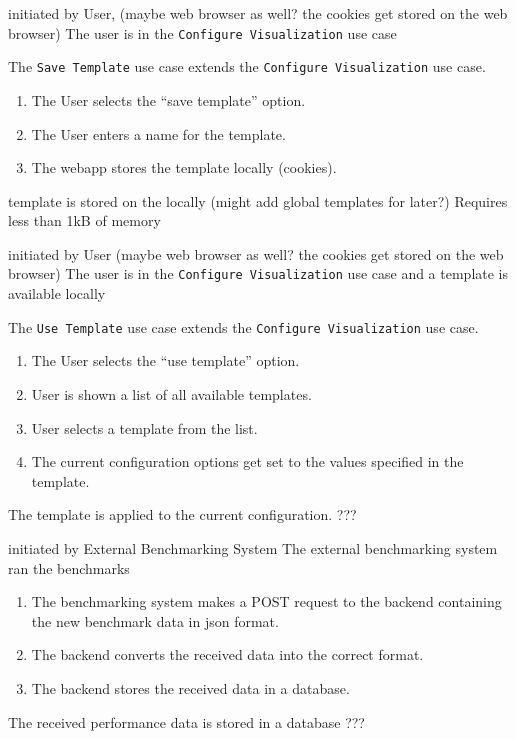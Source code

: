 {initiated by User, (maybe web browser as well? the cookies get stored on the web browser)}
{The user is in the \texttt{Configure Visualization} use case}
{The \texttt{Save Template} use case extends the \texttt{Configure Visualization} use case.
\begin{enumerate}
    \item The User selects the \enquote{save template} option.
    \item The User enters a name for the \gls{template}.
    \item The webapp stores the template locally (cookies).
\end{enumerate}} 
{\Gls{template} is stored on the locally (might add global templates for later?)}
{Requires less than 1kB of memory}

\bigskip

{initiated by User (maybe web browser as well? the cookies get stored on the web browser)}
{The user is in the \texttt{Configure Visualization} use case and a \gls{template} is available locally}
{The \texttt{Use Template} use case extends the \texttt{Configure Visualization} use case.
\begin{enumerate}
    \item The User selects the \enquote{use template} option.
    \item User is shown a list of all available \glspl{template}.
    \item User selects a \gls{template} from the list.
    \item The current \gls{configuration} options get set to the values specified in the template.
\end{enumerate}} 
{The \gls{template} is applied to the current configuration.}
{???}

\bigskip

{initiated by External Benchmarking System}
{The external benchmarking system ran the benchmarks}
{\begin{enumerate}
    \item The benchmarking system makes a POST request to the backend containing the new benchmark data in \acrshort{json} format.
    \item The backend converts the received data into the correct format.
    \item The backend stores the received data in a database.
\end{enumerate}} 
{The received performance data is stored in a database}
{???}

